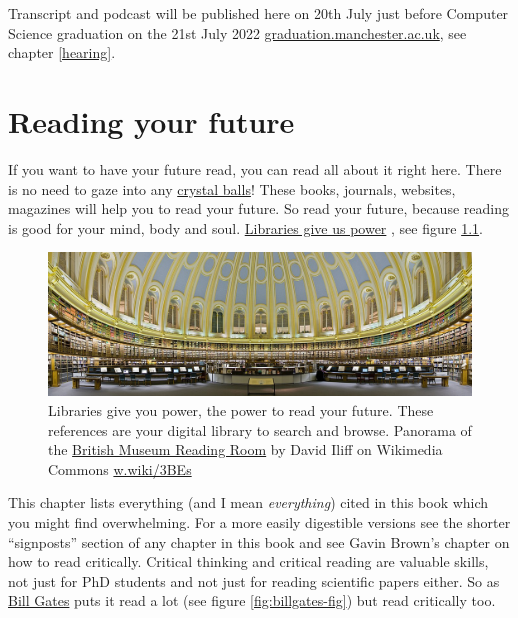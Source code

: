 \documentclass[
]{book}
\begin{document}
Transcript and podcast will be published here on 20th July just before Computer Science graduation on the 21st July 2022 \href{http://www.graduation.manchester.ac.uk/}{graduation.manchester.ac.uk}, see chapter \ref{hearing}.

\hypertarget{reading}{%
\chapter{Reading your future}\label{reading}}

If you want to have your future read, you can read all about it right here. There is no need to gaze into any \href{https://en.wikipedia.org/wiki/Crystal_ball}{crystal balls}! These books, journals, websites, magazines will help you to read your future. So read your future, because reading is good for your mind, body and soul. \href{https://en.wikipedia.org/wiki/A_Design_for_Life}{Libraries give us power} \citep{librariesgiveuspower}, see figure \ref{fig:library-power-fig}.

\begin{figure}

{\centering \includegraphics[width=1\linewidth]{images/Libraries_Give_Us_Power} 

}

\caption{Libraries give you power, the power to read your future. These references are your digital library to search and browse. Panorama of the \href{https://en.wikipedia.org/wiki/British_Museum_Reading_Room}{British Museum Reading Room} by David Iliff on Wikimedia Commons \href{https://w.wiki/3BEs}{w.wiki/3BEs}}\label{fig:library-power-fig}
\end{figure}



This chapter lists everything (and I mean \emph{everything}) cited in this book which you might find overwhelming. For a more easily digestible versions see the shorter ``signposts'' section of any chapter in this book and see Gavin Brown's chapter on how to read critically. Critical thinking and critical reading are valuable skills, not just for PhD students and not just for reading scientific papers either. So as \href{https://en.wikipedia.org/wiki/Bill_Gates}{Bill Gates} puts it read a lot (see figure \ref{fig:billgates-fig}) but read critically too. \citep{howtoread}
\end{document}

